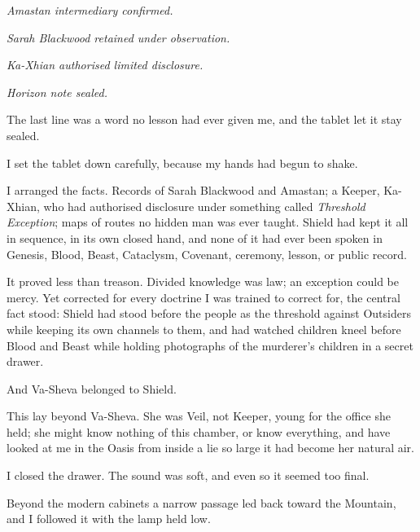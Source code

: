 \textit{Amastan intermediary confirmed.}\par

\textit{Sarah Blackwood retained under observation.}\par

\textit{Ka-Xhian authorised limited disclosure.}\par

\textit{Horizon note sealed.}\par

The last line was a word no lesson had ever given me, and the tablet let it stay sealed.\par


I set the tablet down carefully, because my hands had begun to shake.\par

I arranged the facts. Records of Sarah Blackwood and Amastan; a Keeper, Ka-Xhian, who had authorised disclosure under something called \textit{Threshold Exception}; maps of routes no hidden man was ever taught. Shield had kept it all in sequence, in its own closed hand, and none of it had ever been spoken in Genesis, Blood, Beast, Cataclysm, Covenant, ceremony, lesson, or public record.\par

It proved less than treason. Divided knowledge was law; an exception could be mercy. Yet corrected for every doctrine I was trained to correct for, the central fact stood: Shield had stood before the people as the threshold against Outsiders while keeping its own channels to them, and had watched children kneel before Blood and Beast while holding photographs of the murderer's children in a secret drawer.\par

And Va-Sheva belonged to Shield.\par

This lay beyond Va-Sheva. She was Veil, not Keeper, young for the office she held; she might know nothing of this chamber, or know everything, and have looked at me in the Oasis from inside a lie so large it had become her natural air.\par

I closed the drawer. The sound was soft, and even so it seemed too final.\par

Beyond the modern cabinets a narrow passage led back toward the Mountain, and I followed it with the lamp held low.\par

